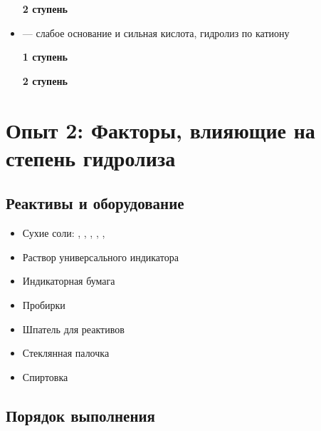 \documentclass[a4paper, 12pt]{article}
\begin{document}
\begin{itemize}
	\textbf{2 ступень}
	
	
	
	\item {} --- слабое основание и сильная кислота, гидролиз по катиону
	
	\textbf{1 ступень}
	
	
	
	\textbf{2 ступень}
	
	
	
\end{itemize}




\section{Опыт 2: Факторы, влияющие на степень гидролиза}

\subsection{Реактивы и оборудование}

\begin{itemize}
	\item Сухие соли: , , , , , 
	
	\item Раствор универсального индикатора
	
	\item Индикаторная бумага
	
	\item Пробирки
	
	\item Шпатель для реактивов
	
	\item Стеклянная палочка
	
	\item Спиртовка
\end{itemize}

\subsection{Порядок выполнения}
\end{document}
